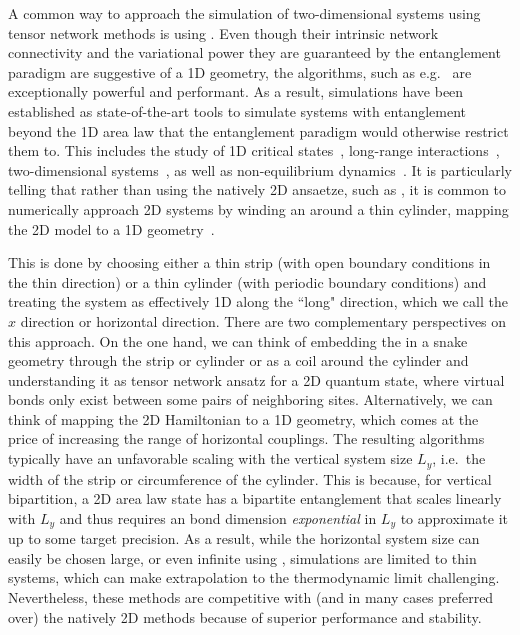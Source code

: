 A common way to approach the simulation of two-dimensional systems using tensor network methods is using  \cite{liang1994a, stoudenmire2012}.
%
Even though their intrinsic network connectivity and the variational power they are guaranteed by the entanglement paradigm are suggestive of a 1D geometry, the  algorithms, such as e.g.~ are exceptionally powerful and performant.
%
As a result,  simulations have been established as state-of-the-art tools to simulate systems with entanglement beyond the 1D area law that the entanglement paradigm would otherwise restrict them to.
%
This includes the study of 1D critical states~\cite{pirvu2012}, long-range interactions~\cite{crosswhite2008c}, two-dimensional systems~\cite{liang1994a, stoudenmire2012}, as well as non-equilibrium dynamics~\cite{daley2004, white2004, vidal2004a, haegeman2011a, zaletel2015a}.
%
It is particularly telling that rather than using the natively 2D ansaetze, such as , it is common to numerically approach 2D systems by winding an  around a thin cylinder, mapping the 2D model to a 1D geometry~\cite{stoudenmire2012, grushin2015, zaletel2014, gong2014}.


This is done by choosing either a thin strip (with open boundary conditions in the thin direction) or a thin cylinder (with periodic boundary conditions) and treating the system as effectively 1D along the ``long" direction, which we call the $x$ direction or horizontal direction.
%
There are two complementary perspectives on this approach.
%
On the one hand, we can think of embedding the  in a snake geometry through the strip or cylinder or as a coil around the cylinder and understanding it as tensor network ansatz for a 2D quantum state, where virtual bonds only exist between some pairs of neighboring sites.
%
Alternatively, we can think of mapping the 2D Hamiltonian to a 1D geometry, which comes at the price of increasing the range of horizontal couplings.
%
The resulting algorithms typically have an unfavorable scaling with the vertical system size $L_y$, i.e.~the width of the strip or circumference of the cylinder.
%
This is because, for vertical bipartition, a 2D area law state has a bipartite entanglement that scales linearly with $L_y$ and thus requires an  bond dimension \emph{exponential} in $L_y$ to approximate it up to some target precision.
%
As a result, while the horizontal system size can easily be chosen large, or even infinite using , simulations are limited to thin systems, which can make extrapolation to the thermodynamic limit challenging.
%
Nevertheless, these  methods are competitive with (and in many cases preferred over) the natively 2D methods because of superior performance and stability.




